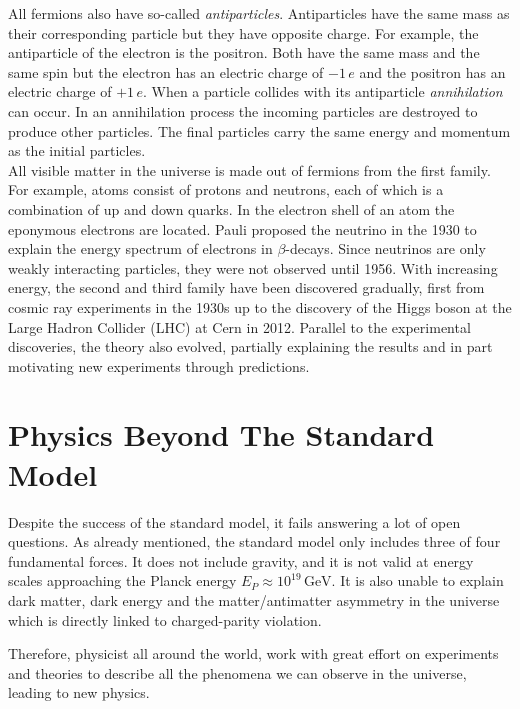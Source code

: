 \documentclass[a4paper,11pt,twosided,final,german,openbib,pdftex,listof=totoc,bibliography=totoc]{scrbook}
\begin{document}
All fermions also have so-called \textit{antiparticles}. Antiparticles have the same mass as their corresponding particle but they have opposite charge. For example, the antiparticle of the electron is the positron. Both have the same mass and the same spin but the electron has an electric charge of $-1\,e$ and the positron has an electric charge of $+1\,e$. When a particle collides with its antiparticle \textit{annihilation} can occur. In an annihilation process the incoming particles are destroyed to produce other particles. The final particles carry the same energy and momentum as the initial particles.\\


All visible matter in the universe is made out of fermions from the first family. For example, atoms consist of protons and neutrons, each of which is a combination of up and down quarks. In the electron shell of an atom the eponymous electrons are located. Pauli proposed the neutrino in the 1930 to explain the energy spectrum of electrons in $\beta$-decays. Since neutrinos are only weakly interacting particles, they were not observed until 1956.\cite{REINES19941} With increasing energy, the second and third family have been discovered gradually, first from cosmic ray experiments in the 1930s up to the discovery of the Higgs boson at the Large Hadron Collider (LHC) at Cern in 2012. Parallel to the experimental discoveries, the theory also evolved, partially explaining the results and in part motivating new experiments through predictions.


\section{Physics Beyond The Standard Model}

Despite the success of the standard model, it fails answering a lot of open questions. As already mentioned, the standard model only includes three of four fundamental forces. It does not include gravity, and it is not valid at energy scales approaching the Planck energy $E_P \approx 10^{19}\,\textrm{GeV} $.\cite{sivaram2007special} It is also unable to explain dark matter, dark energy and the matter/antimatter asymmetry in the universe which is directly linked to charged-parity violation.\cite{HAMBYE2012193}

Therefore, physicist all around the world, work with great effort on experiments and theories to describe all the phenomena we can observe in the universe, leading to new physics.
\end{document}
